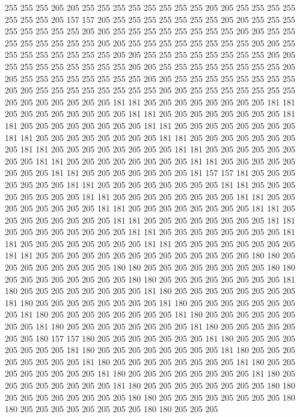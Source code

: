 255 255 255 205 205 255 255 255 255 255 255 255 255 205 205 255 255 255 255 255
255 255 205 157 157 205 255 255 255 255 255 255 255 205 205 255 255 255 255 255
255 255 255 205 205 255 255 255 255 255 255 255 255 205 205 255 255 255 255 255
255 255 255 205 205 255 255 255 255 255 255 255 255 205 205 255 255 255 255 255
255 255 255 205 205 255 255 255 255 255 255 255 255 205 205 255 255 255 255 255
255 255 255 205 205 255 255 255 255 255 255 255 255 205 205 255 255 255 255 255
255 255 255 205 205 255 255 255 255 255 255 255 255 205 205 255 255 255 255 255
255 255 255 205 205 255 255 255 255 255 255 255 205 205 205 205 205 205 205 181
181 205 205 205 205 205 205 205 205 181 181 205 205 205 205 205 205 205 205 181
181 205 205 205 205 205 205 205 205 181 181 205 205 205 205 205 205 205 205 181
181 205 205 205 205 205 205 205 205 181 181 205 205 205 205 205 205 205 205 181
181 205 205 205 205 205 205 205 205 181 181 205 205 205 205 205 205 205 205 181
181 205 205 205 205 205 205 205 205 181 181 205 205 205 205 205 205 205 205 181
181 205 205 205 205 205 205 205 205 181 181 205 205 205 205 205 205 205 181 157
157 181 205 205 205 205 205 205 205 181 181 205 205 205 205 205 205 205 205 181
181 205 205 205 205 205 205 205 205 181 181 205 205 205 205 205 205 205 205 181
181 205 205 205 205 205 205 205 205 181 181 205 205 205 205 205 205 205 205 181
181 205 205 205 205 205 205 205 205 181 181 205 205 205 205 205 205 205 205 181
181 205 205 205 205 205 205 205 205 181 181 205 205 205 205 205 205 205 205 181
181 205 205 205 205 205 205 205 205 181 181 205 205 205 205 205 205 205 205 181
181 205 205 205 205 205 205 205 205 205 205 205 205 205 205 180 180 205 205 205
205 205 205 205 205 180 180 205 205 205 205 205 205 205 205 180 180 205 205 205
205 205 205 205 205 180 180 205 205 205 205 205 205 205 205 181 180 205 205 205
205 205 205 205 205 181 180 205 205 205 205 205 205 205 205 181 180 205 205 205
205 205 205 205 205 181 180 205 205 205 205 205 205 205 205 181 180 205 205 205
205 205 205 205 205 181 180 205 205 205 205 205 205 205 205 181 180 205 205 205
205 205 205 205 205 181 180 205 205 205 205 205 205 205 180 157 157 180 205 205
205 205 205 205 205 181 180 205 205 205 205 205 205 205 205 181 180 205 205 205
205 205 205 205 205 181 180 205 205 205 205 205 205 205 205 181 180 205 205 205
205 205 205 205 205 181 180 205 205 205 205 205 205 205 205 181 180 205 205 205
205 205 205 205 205 181 180 205 205 205 205 205 205 205 205 181 180 205 205 205
205 205 205 205 205 180 180 205 205 205 205 205 205 205 205 180 180 205 205 205
205 205 205 205 205 180 180 205 205 205 205 205 205 205 205 180 180 205 205 205
